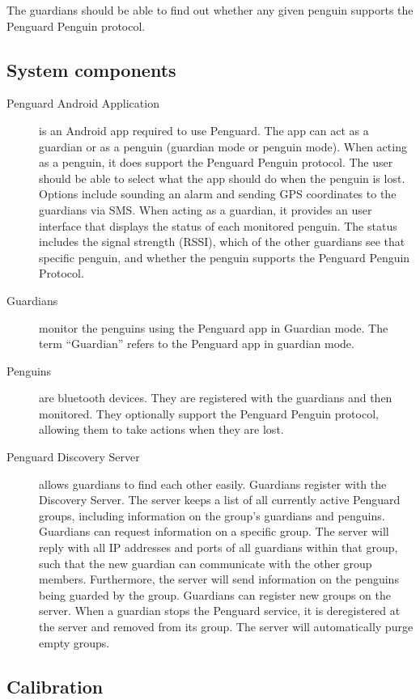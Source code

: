 \documentclass{report}
\begin{document}
The guardians should be able to find out whether any given penguin supports the Penguard Penguin protocol.

\subsection{System components}

\begin{description}
    \item [Penguard Android Application] is an Android app required to use Penguard. The app can act as a guardian or as a penguin (guardian mode or penguin mode). When acting as a penguin, it does support the Penguard Penguin protocol. The user should be able to select what the app should do when the penguin is lost. Options include sounding an alarm and sending GPS coordinates to the guardians via SMS. When acting as a guardian, it provides an user interface that displays the status of each monitored penguin. The status includes the signal strength (RSSI), which of the other guardians see that specific penguin, and whether the penguin supports the Penguard Penguin Protocol.
    \item [Guardians] monitor the penguins using the Penguard app in Guardian mode. The term ``Guardian'' refers to the Penguard app in guardian mode.
    \item [Penguins] are bluetooth devices. They are registered with the guardians and then monitored. They optionally support the Penguard Penguin protocol, allowing them to take actions when they are lost.
    \item [Penguard Discovery Server] allows guardians to find each other easily. Guardians register with the Discovery Server. The server keeps a list of all currently active Penguard groups, including information on the group's guardians and penguins. Guardians can request information on a specific group. The server will reply with all IP addresses and ports of all guardians within that group, such that the new guardian can communicate with the other group members. Furthermore, the server will send information on the penguins being guarded by the group. Guardians can register new groups on the server. When a guardian stops the Penguard service, it is deregistered at the server and removed from its group. The server will automatically purge empty groups. 
\end{description}

\subsection{Calibration}
\end{document}
